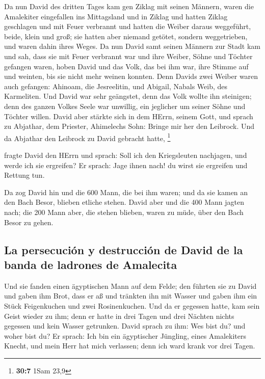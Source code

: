  Da nun David des dritten Tages kam gen Ziklag mit seinen
Männern, waren die Amalekiter eingefallen ins Mittagsland und in Ziklag
und hatten Ziklag geschlagen und mit Feuer verbrannt  und
hatten die Weiber daraus weggeführt, beide, klein und groß; sie hatten
aber niemand getötet, sondern weggetrieben, und waren dahin ihres Weges.
 Da nun David samt seinen Männern zur Stadt kam und sah,
dass sie mit Feuer verbrannt war und ihre Weiber, Söhne und Töchter
gefangen waren,  hoben David und das Volk, das bei ihm
war, ihre Stimme auf und weinten, bis sie nicht mehr weinen konnten.
 Denn Davids zwei Weiber waren auch gefangen: Ahinoam, die
Jesreelitin, und Abigail, Nabals Weib, des Karmeliten. 
Und David war sehr geängstet, denn das Volk wollte ihn steinigen; denn
des ganzen Volkes Seele war unwillig, ein jeglicher um seiner Söhne und
Töchter willen. David aber stärkte sich in dem HErrn, seinem Gott,
 und sprach zu Abjathar, dem Priester, Ahimelechs Sohn:
Bringe mir her den Leibrock. Und da Abjathar den Leibrock zu David
gebracht hatte, \footnote{\textbf{30:7} 1Sam 23,9}

 fragte David den HErrn und sprach: Soll ich den
Kriegsleuten nachjagen, und werde ich sie ergreifen? Er sprach: Jage
ihnen nach! du wirst sie ergreifen und Rettung tun.

 Da zog David hin und die 600 Mann, die bei ihm waren; und
da sie kamen an den Bach Besor, blieben etliche stehen. 
David aber und die 400 Mann jagten nach; die 200 Mann aber, die stehen
blieben, waren zu müde, über den Bach Besor zu gehen.

\hypertarget{la-persecuciuxf3n-y-destrucciuxf3n-de-david-de-la-banda-de-ladrones-de-amalecita}{%
\subsection{La persecución y destrucción de David de la banda de
ladrones de
Amalecita}\label{la-persecuciuxf3n-y-destrucciuxf3n-de-david-de-la-banda-de-ladrones-de-amalecita}}

 Und sie fanden einen ägyptischen Mann auf dem Felde; den
führten sie zu David und gaben ihm Brot, dass er aß und tränkten ihn mit
Wasser  und gaben ihm ein Stück Feigenkuchen und zwei
Rosinenkuchen. Und da er gegessen hatte, kam sein Geist wieder zu ihm;
denn er hatte in drei Tagen und drei Nächten nichts gegessen und kein
Wasser getrunken.  David sprach zu ihm: Wes bist du? und
woher bist du? Er sprach: Ich bin ein ägyptischer Jüngling, eines
Amalekiters Knecht, und mein Herr hat mich verlassen; denn ich ward
krank vor drei Tagen.


